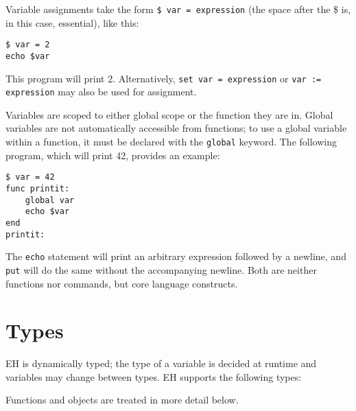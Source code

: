 \documentclass{article}
\begin{document}
Variable assignments take the form \verb#$ var = expression# (the space after the \$ is, in this case, essential), like this:
\begin{verbatim}
$ var = 2
echo $var
\end{verbatim}
This program will print 2. 
Alternatively, \verb#set var = expression# or \verb#var := expression# may also be used for assignment.

Variables are scoped to either global scope or the function they are in. 
Global variables are not automatically accessible from functions; to use a global variable within a function, it must be declared with the \verb#global# keyword. 
The following program, which will print 42, provides an example:
\begin{verbatim}
$ var = 42
func printit:
	global var
	echo $var
end
printit:
\end{verbatim}

The \verb#echo# statement will print an arbitrary expression followed by a newline, and \verb#put# will do the same without the accompanying newline. 
Both are neither functions nor commands, but core language constructs.

\section{Types}
EH is dynamically typed; the type of a variable is decided at runtime and variables may change between types. 
EH supports the following types:
Functions and objects are treated in more detail below.
\end{document}
